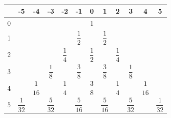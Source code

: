 \documentclass[a0,portrait]{a0poster}
\begin{document}
\begin{center}
{\begin{center}
\small
\begin{tabular}{|c||c|c|c|c|c|c|c|c|c|c|c|}
\hline 
& -5 & -4 & -3 & -2 & -1 & 0 & 1 & 2 & 3 & 4 & 5 \\
\hline \hline
\hspace*{\fill} 0 \hspace*{\fill} &  &  &  &  &  & 1 &  &  &  &  & \\
\hline 
1 &  &  &  &  & $\dfrac{ 1 }{ 2 }$ &  & $\dfrac{ 1 }{ 2 }$ &  &  &  & \hspace*{\fill} \\
\hline 
2 &  &  &  & $\dfrac{1}{4}$ &  & $\dfrac{1}{2}$ &  & $\dfrac{1}{4}$ &  &  & \hspace*{\fill} \\
\hline 
3 &  &  &  $\dfrac{1}{8}$ &  & $\dfrac{3}{8}$ &  & $\dfrac{3}{8}$ &  & $\dfrac{1}{8}$  &  & \hspace*{\fill} \\
\hline 
4 &  & \hspace*{\fill} $\dfrac{1}{16}$ \hspace*{\fill} &  & \hspace*{\fill} $\dfrac{1}{4}$ \hspace*{\fill} &  & \hspace*{\fill} $\dfrac{3}{8}$ \hspace*{\fill} &  & \hspace*{\fill} $\dfrac{1}{4}$ \hspace*{\fill} &  & \hspace*{\fill} $\dfrac{1}{16}$ \hspace*{\fill} & \hspace*{\fill} \\
\hline 
5 & \hspace*{\fill} $\dfrac{1}{32}$ \hspace*{\fill} &  & \hspace*{\fill} $\dfrac{5}{32}$ \hspace*{\fill} &  & \hspace*{\fill} $\dfrac{5}{16}$ \hspace*{\fill} &  & \hspace*{\fill} $\dfrac{5}{16}$ \hspace*{\fill} &  & \hspace*{\fill} $\dfrac{5}{32}$ \hspace*{\fill} &  & \hspace*{\fill} $\dfrac{1}{32}$ \hspace*{\fill} \\
\hline 
\end{tabular}
\end{center}

}
\end{center}
\end{document}
